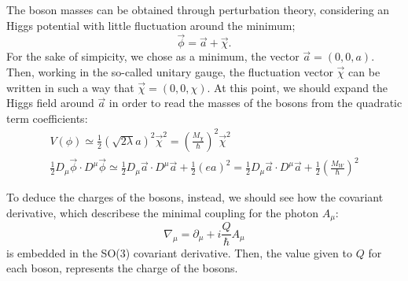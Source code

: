 The boson masses can be obtained through perturbation theory, considering an Higgs potential with little fluctuation around the minimum;
\begin{equation}
\vec{\phi} = \vec{a}+ \vec{\chi}. 
\end{equation}
For the sake of simpicity, we chose as a minimum, the vector $\vec{a}= (0,0,a)$. Then, working in the so-called unitary gauge, the fluctuation vector $\vec{\chi}$ can be written in such a way that $\vec{\chi} = (0,0,\chi) $.
At this point, we should expand the Higgs field around $\vec{a}$ in order to read the masses of the bosons from the quadratic term coefficients:
\begin{gather}
V(\phi)\simeq  \frac{1}{2}  \left(\sqrt{2 \lambda} a\right)^2 \vec{\chi}^2 = \left( \frac{M_\chi}{\hbar }\right)^2 \vec{\chi}^2 \\
 \frac{1}{2}D_{\mu}\vec{\phi} \cdot  D^\mu \vec{\phi} \simeq  \frac{1}{2}D_{\mu}\vec{a} \cdot  D^\mu \vec{a}  + \frac{1}{2} \left( ea \right)^2 =\frac{1}{2}D_{\mu}\vec{a} \cdot  D^\mu \vec{a}  + \frac{1}{2} \left( \frac{M_W}{\hbar} \right)^2
\end{gather}

To deduce the charges of the bosons, instead, we should see how the covariant derivative, which describese the minimal coupling for the photon $A_{\mu}$: 
\begin{equation}
\nabla_\mu = \partial_\mu + i \frac{Q}{\hbar} A_{\mu}
\end{equation}
is embedded in the SO(3) covariant derivative. Then, the value given to $Q$ for each boson, represents the charge of the bosons. 


